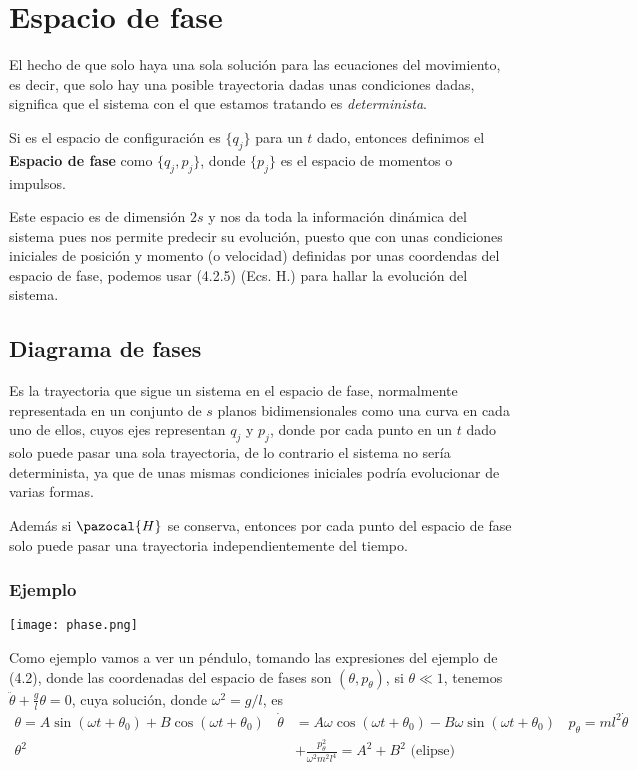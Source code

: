 \section{Espacio de fase} 
El hecho de que solo haya una sola solución para las ecuaciones del movimiento, es decir, que solo hay una posible trayectoria dadas unas condiciones dadas, significa que el sistema con el que estamos tratando es \textit{determinista}.

Si es el espacio de configuración es $\{q_j\}$ para un $t$ dado, entonces definimos el \textbf{Espacio de fase} como $\{q_j,p_j\}$, donde $\{p_j\}$ es el espacio de momentos o impulsos.

Este espacio es de dimensión $2s$ y nos da toda la información dinámica del sistema pues nos permite predecir su evolución, puesto que con unas condiciones iniciales de posición y momento (o velocidad) definidas por unas coordendas del espacio de fase, podemos usar (4.2.5) (Ecs. H.) para hallar la evolución del sistema.
\subsection{Diagrama de fases}
Es la trayectoria que sigue un sistema en el espacio de fase, normalmente representada en un conjunto de $s$ planos bidimensionales como una curva en cada uno de ellos, cuyos ejes representan $q_j$ y $p_j$, donde por cada punto en un $t$ dado solo puede pasar una sola trayectoria, de lo contrario el sistema no sería determinista, ya que de unas mismas condiciones iniciales podría evolucionar de varias formas.

Además si $\pazocal{H}$ se conserva, entonces por cada punto del espacio de fase solo puede pasar una trayectoria independientemente del tiempo.

\subsubsection{Ejemplo}
\begin{marginfigure}[0cm]
	\texttt{[image: phase.png]}
\end{marginfigure}
Como ejemplo vamos a ver un péndulo, tomando las expresiones del ejemplo de (4.2), donde las coordenadas del espacio de fases son $(\theta,p_\theta)$, si $\theta \ll 1$, tenemos $\ddot{\theta}+\frac{g}{l}\theta=0$, cuya solución, donde $\omega^2=g/l$, es
\[
    \begin{split}
        \theta = A \sin{(\omega t + \theta_0)}+ B \cos{(\omega t + \theta_0)} \ \ \ \ \dot{\theta} &= A\omega \cos{(\omega t + \theta_0)}- B \omega \sin{(\omega t + \theta_0)} \ \ \ \ p_\theta = ml^2 \dot{\theta}\\ 
        \theta^2 &+ \frac{p_\theta^2}{\omega^2 m^2l^4}=A^2+B^2 \mbox{ (elipse)}
    \end{split}    
\]

